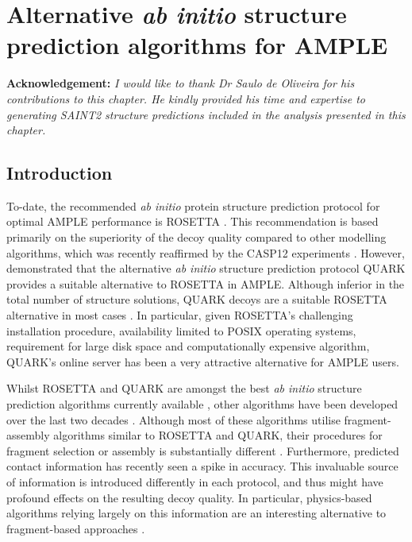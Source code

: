 \chapter{Alternative \textit{ab initio} structure prediction algorithms for AMPLE} \label{chap:alternate_abinitio_protocols}
\clearpage

\textbf{Acknowledgement: }\textit{I would like to thank Dr Saulo de Oliveira for his contributions to this chapter. He kindly provided his time and expertise to generating SAINT2 structure predictions included in the analysis presented in this chapter.}

\section{Introduction}
To-date, the recommended \textit{ab initio} protein structure prediction protocol for optimal AMPLE performance is ROSETTA \cite{Keegan2015-zb,Thomas2017-sh,Thomas2015-wu,Bibby2012-lm}. This recommendation is based primarily on the superiority of the decoy quality compared to other modelling algorithms, which was recently reaffirmed by the CASP12 experiments \cite{Abriata2018-lu,Ovchinnikov2018-wp}. However, \textcite{Keegan2015-zb} demonstrated that the alternative \textit{ab initio} structure prediction protocol QUARK provides a suitable alternative to ROSETTA in AMPLE. Although inferior in the total number of structure solutions, QUARK decoys are a suitable ROSETTA alternative in most cases \cite{Keegan2015-zb}. In particular, given ROSETTA's challenging installation procedure, availability limited to POSIX operating systems, requirement for large disk space and computationally expensive algorithm, QUARK's online server has been a very attractive alternative for AMPLE users.

Whilst ROSETTA and QUARK are amongst the best \textit{ab initio} structure prediction algorithms currently available \cite{Abriata2018-lu}, other algorithms have been developed over the last two decades \cite[e.g.,][]{Jones2001-mc,Ellis2010-zs,Adhikari2015-lb,Xu2012-jf,Marks2011-os,Wang2016-ar}. Although most of these algorithms utilise fragment-assembly algorithms similar to ROSETTA and QUARK, their procedures for fragment selection or assembly is substantially different \cite{Ellis2010-zs,Jones2001-mc}. Furthermore, predicted contact information has recently seen a spike in accuracy. This invaluable source of information is introduced differently in each protocol, and thus might have profound effects on the resulting decoy quality. In particular, physics-based algorithms relying largely on this information are an interesting alternative to fragment-based approaches \cite{Adhikari2015-lb,Marks2011-os,Wang2016-ar,Dos_Santos2018-lq}.

